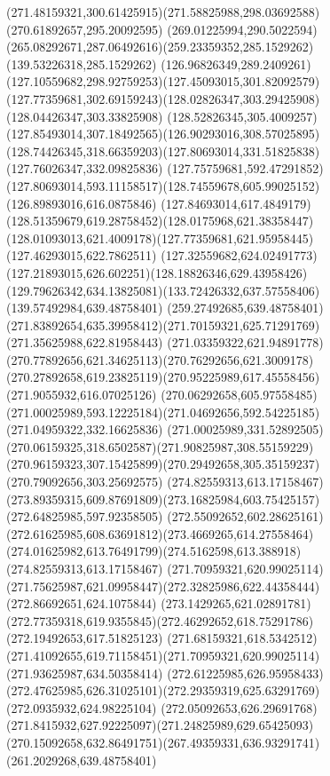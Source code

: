 {{\curveto(271.48159321,300.61425915)(271.58825988,298.03692588)(270.61892657,295.20092595)
\curveto(269.01225994,290.5022594)(265.08292671,287.06492616)(259.23359352,285.1529262)
\lineto(139.53226318,285.1529262)
\curveto(126.96826349,289.2409261)(127.10559682,298.92759253)(127.45093015,301.82092579)
\curveto(127.77359681,302.69159243)(128.02826347,303.29425908)(128.04426347,303.33825908)
\curveto(128.52826345,305.4009257)(127.85493014,307.18492565)(126.90293016,308.57025895)
\curveto(128.74426345,318.66359203)(127.80693014,331.51825838)(127.76026347,332.09825836)
\lineto(127.75759681,592.47291852)
\curveto(127.80693014,593.11158517)(128.74559678,605.99025152)(126.89893016,616.0875846)
\curveto(127.84693014,617.4849179)(128.51359679,619.28758452)(128.0175968,621.38358447)
\curveto(128.01093013,621.4009178)(127.77359681,621.95958445)(127.46293015,622.7862511)
\curveto(127.32559682,624.02491773)(127.21893015,626.602251)(128.18826346,629.43958426)
\curveto(129.79626342,634.13825081)(133.72426332,637.57558406)(139.57492984,639.48758401)
\lineto(259.27492685,639.48758401)
\curveto(271.83892654,635.39958412)(271.70159321,625.71291769)(271.35625988,622.81958443)
\curveto(271.03359322,621.94891778)(270.77892656,621.34625113)(270.76292656,621.3009178)
\curveto(270.27892658,619.23825119)(270.95225989,617.45558456)(271.9055932,616.07025126)
\curveto(270.06292658,605.97558485)(271.00025989,593.12225184)(271.04692656,592.54225185)
\lineto(271.04959322,332.16625836)
\curveto(271.00025989,331.52892505)(270.06159325,318.6502587)(271.90825987,308.55159229)
\curveto(270.96159323,307.15425899)(270.29492658,305.35159237)(270.79092656,303.25692575)
\moveto(274.82559313,613.17158467)
\curveto(273.89359315,609.87691809)(273.16825984,603.75425157)(272.64825985,597.92358505)
\curveto(272.55092652,602.28625161)(272.61625985,608.63691812)(273.4669265,614.27558464)
\curveto(274.01625982,613.76491799)(274.5162598,613.388918)(274.82559313,613.17158467)
\moveto(271.70959321,620.99025114)
\curveto(271.75625987,621.09958447)(272.32825986,622.44358444)(272.86692651,624.1075844)
\lineto(273.1429265,621.02891781)
\curveto(272.77359318,619.9355845)(272.46292652,618.75291786)(272.19492653,617.51825123)
\curveto(271.68159321,618.5342512)(271.41092655,619.71158451)(271.70959321,620.99025114)
\moveto(271.93625987,634.50358414)
\lineto(272.61225985,626.95958433)
\curveto(272.47625985,626.31025101)(272.29359319,625.63291769)(272.0935932,624.98225104)
\curveto(272.05092653,626.29691768)(271.8415932,627.92225097)(271.24825989,629.65425093)
\curveto(270.15092658,632.86491751)(267.49359331,636.93291741)(261.2029268,639.48758401)
}}
